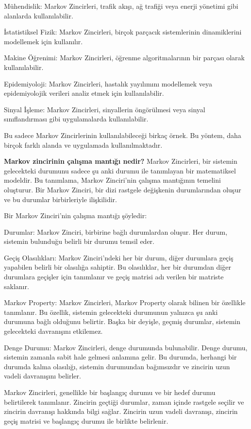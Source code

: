 \documentclass[11pt]{article}
\begin{document}
Mühendislik: Markov Zincirleri, trafik akışı, ağ trafiği veya enerji yönetimi gibi alanlarda kullanılabilir.

İstatistiksel Fizik: Markov Zincirleri, birçok parçacık sistemlerinin dinamiklerini modellemek için kullanılır.

Makine Öğrenimi: Markov Zincirleri, öğrenme algoritmalarının bir parçası olarak kullanılabilir.

Epidemiyoloji: Markov Zincirleri, hastalık yayılımını modellemek veya epidemiyolojik verileri analiz etmek için kullanılabilir.

Sinyal İşleme: Markov Zincirleri, sinyallerin öngörülmesi veya sinyal sınıflandırması gibi uygulamalarda kullanılabilir.

Bu sadece Markov Zincirlerinin kullanılabileceği birkaç örnek. Bu yöntem, daha birçok farklı alanda ve uygulamada kullanılmaktadır.

\textbf{Markov zincirinin çalışma mantığı nedir?}
Markov Zincirleri, bir sistemin gelecekteki durumunu sadece şu anki durumu ile tanımlayan bir matematiksel modeldir. Bu tanımlama, Markov Zinciri'nin çalışma mantığının temelini oluşturur. Bir Markov Zinciri, bir dizi rastgele değişkenin durumlarından oluşur ve bu durumlar birbirleriyle ilişkilidir.

Bir Markov Zinciri'nin çalışma mantığı şöyledir:

Durumlar: Markov Zinciri, birbirine bağlı durumlardan oluşur. Her durum, sistemin bulunduğu belirli bir durumu temsil eder.

Geçiş Olasılıkları: Markov Zinciri'ndeki her bir durum, diğer durumlara geçiş yapabilen belirli bir olasılığa sahiptir. Bu olasılıklar, her bir durumdan diğer durumlara geçişler için tanımlanır ve geçiş matrisi adı verilen bir matriste saklanır.

Markov Property: Markov Zincirleri, Markov Property olarak bilinen bir özellikle tanımlanır. Bu özellik, sistemin gelecekteki durumunun yalnızca şu anki durumuna bağlı olduğunu belirtir. Başka bir deyişle, geçmiş durumlar, sistemin gelecekteki davranışını etkilemez.

Denge Durumu: Markov Zincirleri, denge durumunda bulunabilir. Denge durumu, sistemin zamanla sabit hale gelmesi anlamına gelir. Bu durumda, herhangi bir durumda kalma olasılığı, sistemin durumundan bağımsızdır ve zincirin uzun vadeli davranışını belirler.

Markov Zincirleri, genellikle bir başlangıç durumu ve bir hedef durumu belirtilerek tanımlanır. Zincirin geçtiği durumlar, zaman içinde rastgele seçilir ve zincirin davranışı hakkında bilgi sağlar. Zincirin uzun vadeli davranışı, zincirin geçiş matrisi ve başlangıç durumu ile birlikte belirlenir.
\end{document}
